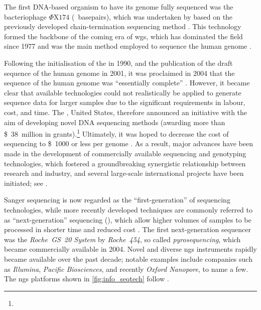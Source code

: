 The first DNA-based organism to have its genome fully sequenced was the bacteriophage $\Phi\text{X174}$ (~basepairs), which was undertaken by \citet{Sanger:1977vp} based on the previously developed chain-termination sequencing method \citep{Sanger:1975iz}.
This technology formed the backbone of the coming era of \gls{wgs}, which has dominated the field since 1977 and was the main method employed to sequence the human genome \citep{IntHumGenSeqCon:2001hk,Venter:2001fq}.

Following the initialisation of the  in 1990, and the publication of the draft sequence of the human genome in 2001, it was proclaimed in 2004 that the sequence of the human genome was ``essentially complete'' \citep{IntHumGenSeqCon:2004bm}.
However, it became clear that available technologies could not realistically be applied to generate sequence data for larger samples due to the significant requirements in labour, cost, and time.
The , United States, therefore announced an initiative with the aim of developing novel DNA sequencing methods (awarding more than \SI{38}[\$]{million} in grants).\footnote{ }
Ultimately, it was hoped to decrease the cost of sequencing to \SI{1000}[\$]{} or less per genome \citep{Mardis:2006ku}.
As a result, major advances have been made in the development of commercially available sequencing and genotyping technologies, which fostered a groundbreaking synergistic relationship between research and industry, and several large-scale international projects have been initiated; see .

%

%

Sanger sequencing is now regarded as the ``first-generation'' of sequencing technologies, while more recently developed techniques are commonly referred to as ``next-generation'' sequencing (), which allow higher volumes of samples to be processed in shorter time and reduced cost \citep{Metzker:2009ew}.
The first next-generation sequencer was the \emph{Roche~GS~20 System} by \textsl{Roche~454}, so called \emph{pyrosequencing}, which became commercially available in 2004.
Novel and diverse \gls{ngs} instruments rapidly became available over the past decade; notable examples include companies such as \textsl{Illumina}, \textsl{Pacific Biosciences}, and recently \textsl{Oxford Nanopore}, to name a few.
The \gls{ngs} platforms shown in \cref{fig:info_seqtech} follow \citet{Mardis:2017cq}.

